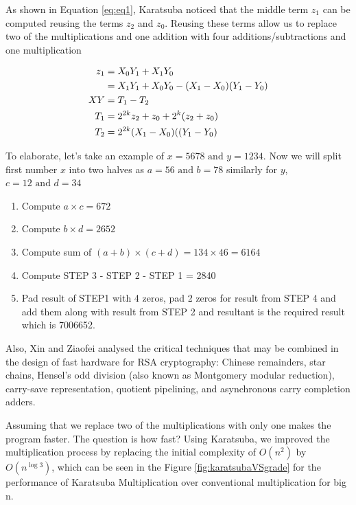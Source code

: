 \documentclass[12pt,journal,compsoc]{IEEEtran}
\begin{document}
As shown in Equation \ref{eq:eq1}, Karatsuba\cite{karatsuba} noticed that the middle term $z_1$ can be computed reusing the terms $z_2$ and $z_0$. Reusing these terms allow us to  replace two of the multiplications and one addition with four additions/subtractions and one multiplication

\begin{align}
z_{1} &=  X_{0}Y_{1} + X_{1}Y_{0} \notag\\
&=  X_{1}Y_{1} + X_{0}Y_{0} - (X_{1} - X_{0})(Y_{1} - Y_{0}) \notag\\
XY &= T_{1} - T_{2} \notag \\
T_{1} &= 2^{2k}z_{2} + z_{0} + 2^{k}(z_{2} + z_{0}) \notag \\
T_{2} &= 2^{2k}(X_{1} - X_{0})((Y_{1}-Y_{0})
\label{eq:eq2}
\end{align}


To elaborate, let's take an example of $x = 5678 \text{ and } y = 1234$. Now we will split first number $x$ into two halves as $a=56 \text{ and }b=78$ similarly for $y$, $c=12 \text{ and } d=34$

\begin{enumerate}[ {STEP }1{:} ]
	\item Compute $a \times c = 672$
	\item Compute $b \times d = 2652$
	\item Compute sum of $(a + b)\times (c +d) = 134 \times 46 = 6164$
	\item Compute STEP 3 - STEP 2 - STEP 1 = 2840
	\item Pad result of STEP1 with 4 zeros, pad 2 zeros for result from STEP 4 and add them along with result from STEP 2 and resultant is the required result which is 7006652.
\end{enumerate}

Also, Xin  and Ziaofei\cite{378085} analysed the critical techniques that may be combined in the design of fast hardware for RSA cryptography: Chinese remainders, star chains, Hensel's odd division (also known as Montgomery modular reduction), carry-save representation, quotient pipelining, and asynchronous carry completion adders.

Assuming that we replace two of the multiplications with only one makes the program faster. The question is how fast? Using Karatsuba, we improved the multiplication process by replacing the initial complexity of $O(n^{2})$ by $O(n^{\log 3})$, which can be seen in the Figure \ref{fig:karatsubaVSgrade} for the performance of Karatsuba Multiplication over conventional multiplication for big n.
\end{document}
